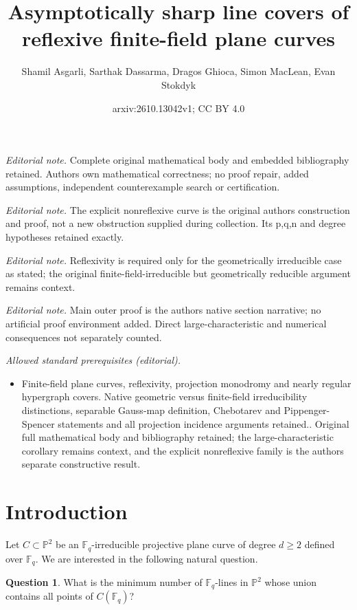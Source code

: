\documentclass[10pt,a4paper]{amsart}
\title{Asymptotically sharp line covers of reflexive finite-field plane curves}
\author{Shamil Asgarli, Sarthak Dassarma, Dragos Ghioca, Simon MacLean, Evan Stokdyk}
\date{arxiv:2610.13042v1; CC BY 4.0}
\theoremstyle{definition}
\newtheorem{question}[theorem]{Question}
\theoremstyle{remark}
\newcommand{\Fq}{\mathbb{F}_q}
\newcommand{\bP}{\mathbb{P}}
\begin{document}
\maketitle
\noindent\textit{Editorial note.} Complete original mathematical body and embedded bibliography retained. Authors own mathematical correctness; no proof repair, added assumptions, independent counterexample search or certification.\par\medskip
\noindent\textit{Editorial note.} The explicit nonreflexive curve is the original authors construction and proof, not a new obstruction supplied during collection. Its p,q,n and degree hypotheses retained exactly.\par\medskip
\noindent\textit{Editorial note.} Reflexivity is required only for the geometrically irreducible case as stated; the original finite-field-irreducible but geometrically reducible argument remains context.\par\medskip
\noindent\textit{Editorial note.} Main outer proof is the authors native section narrative; no artificial proof environment added. Direct large-characteristic and numerical consequences not separately counted.\par\medskip
\noindent\textit{Allowed standard prerequisites (editorial).}\begin{itemize}
\item Finite-field plane curves, reflexivity, projection monodromy and nearly regular hypergraph covers. Native geometric versus finite-field irreducibility distinctions, separable Gauss-map definition, Chebotarev and Pippenger-Spencer statements and all projection incidence arguments retained.. Original full mathematical body and bibliography retained; the large-characteristic corollary remains context, and the explicit nonreflexive family is the authors separate constructive result.
\end{itemize}\medskip
\section{Introduction}

Let $C \subset \bP^2$ be an $\Fq$-irreducible projective plane curve of degree $d\geq 2$ defined over $\Fq$. We are interested in the following natural question.

\begin{question}
What is the minimum number of $\Fq$-lines in $\bP^2$ whose union contains all points of $C(\Fq)$?
\end{question}
\end{document}
